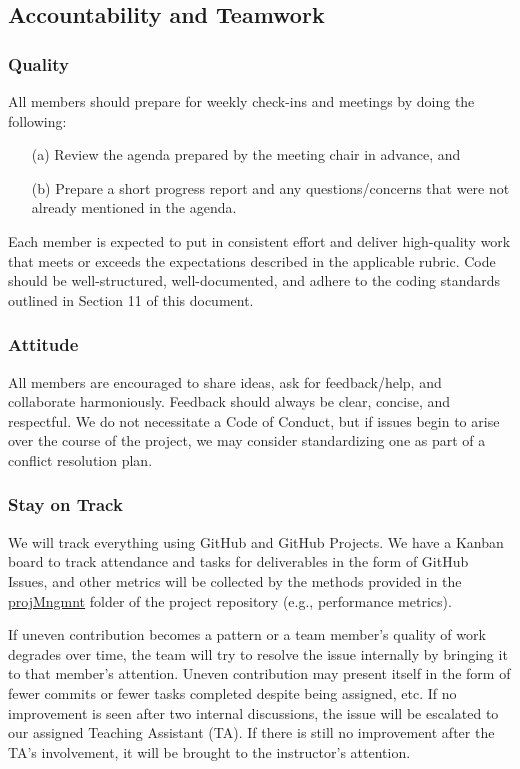 \documentclass{article}
\begin{document}
\subsection*{Accountability and Teamwork}

\subsubsection*{Quality} 

All members should prepare for weekly check-ins and meetings by doing the following:

\begin{itemize}
  \item[(a)] Review the agenda prepared by the meeting chair in advance, and
  \item[(b)] Prepare a short progress report and any questions/concerns that were not
  already mentioned in the agenda.
\end{itemize}

Each member is expected to put in consistent effort and deliver high-quality work
that meets or exceeds the expectations described in the applicable rubric. Code
should be well-structured, well-documented, and adhere to the coding standards
outlined in Section 11 of this document.

\subsubsection*{Attitude}

All members are encouraged to share ideas, ask for feedback/help, and collaborate
harmoniously. Feedback should always be clear, concise, and respectful. We do not
necessitate a Code of Conduct, but if issues begin to arise over the course of the
project, we may consider standardizing one as part of a conflict resolution plan.

\subsubsection*{Stay on Track}

We will track everything using GitHub and GitHub Projects. We have a Kanban board to
track attendance and tasks for deliverables in the form of GitHub Issues, and other
metrics will be collected by the methods provided in the \href{https://github.com/SumanyaG/Alkalytics/tree/main/docs/projMngmnt}{projMngmnt}
folder of the project repository (e.g., performance metrics).

If uneven contribution becomes a pattern or a team member’s quality of work degrades
over time, the team will try to resolve the issue internally by bringing it to that
member’s attention. Uneven contribution may present itself in the form of fewer
commits or fewer tasks completed despite being assigned, etc. If no improvement is
seen after two internal discussions, the issue will be escalated to our assigned
Teaching Assistant (TA). If there is still no improvement after the TA's involvement,
it will be brought to the instructor's attention.
\end{document}
